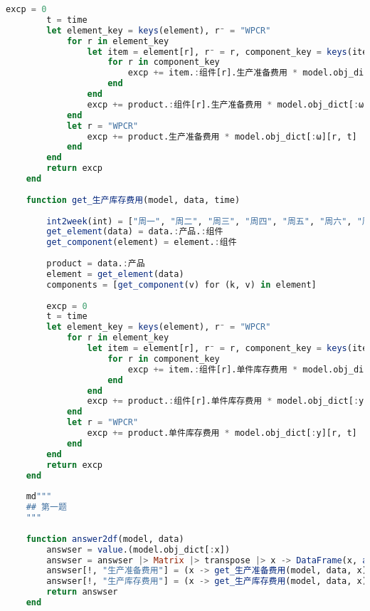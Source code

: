 \begin{appendices}
\begin{lstlisting}[language=julia]
        excp = 0
        t = time
        let element_key = keys(element), r⁻ = "WPCR"
            for r in element_key
                let item = element[r], r⁻ = r, component_key = keys(item.:组件)
                    for r in component_key
                        excp += item.:组件[r].生产准备费用 * model.obj_dict[:ω][r, t]
                    end
                end
                excp += product.:组件[r].生产准备费用 * model.obj_dict[:ω][r, t]
            end
            let r = "WPCR"
                excp += product.生产准备费用 * model.obj_dict[:ω][r, t]
            end
        end
        return excp
    end
    
    function get_生产库存费用(model, data, time)
    
        int2week(int) = ["周一", "周二", "周三", "周四", "周五", "周六", "周日"][int]
        get_element(data) = data.:产品.:组件
        get_component(element) = element.:组件
    
        product = data.:产品
        element = get_element(data)
        components = [get_component(v) for (k, v) in element]
    
        excp = 0
        t = time
        let element_key = keys(element), r⁻ = "WPCR"
            for r in element_key
                let item = element[r], r⁻ = r, component_key = keys(item.:组件)
                    for r in component_key
                        excp += item.:组件[r].单件库存费用 * model.obj_dict[:y][r, t]
                    end
                end
                excp += product.:组件[r].单件库存费用 * model.obj_dict[:y][r, t]
            end
            let r = "WPCR"
                excp += product.单件库存费用 * model.obj_dict[:y][r, t]
            end
        end
        return excp
    end
    
    md"""
    ## 第一题
    """
    
    function answer2df(model, data)
        answser = value.(model.obj_dict[:x])
        answser = answser |> Matrix |> transpose |> x -> DataFrame(x, axes(answser)[1])
        answser[!, "生产准备费用"] = (x -> get_生产准备费用(model, data, x)).([1, 2, 3, 4, 5, 6, 7]) .|> value
        answser[!, "生产库存费用"] = (x -> get_生产库存费用(model, data, x)).([1, 2, 3, 4, 5, 6, 7]) .|> value
        return answser
    end
    

\end{lstlisting}
\end{appendices}
